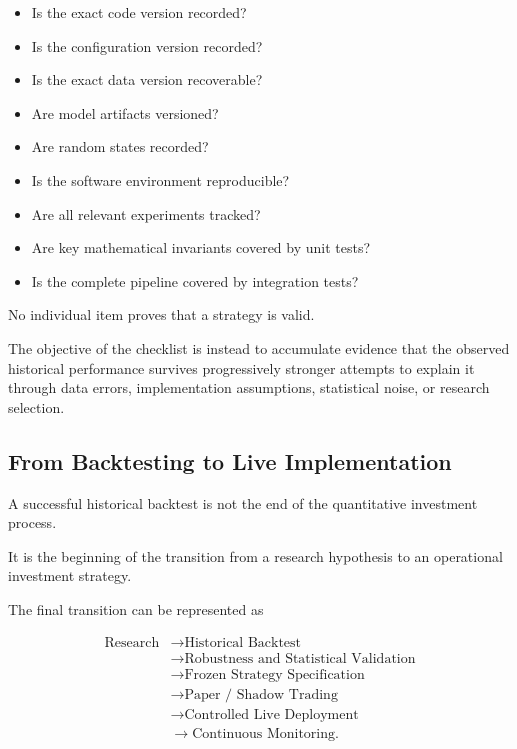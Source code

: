 \documentclass[11pt,a4paper]{article}
\begin{document}
\begin{itemize}
    \item[$\square$] Is the exact code version recorded?
    \item[$\square$] Is the configuration version recorded?
    \item[$\square$] Is the exact data version recoverable?
    \item[$\square$] Are model artifacts versioned?
    \item[$\square$] Are random states recorded?
    \item[$\square$] Is the software environment reproducible?
    \item[$\square$] Are all relevant experiments tracked?
    \item[$\square$] Are key mathematical invariants covered by unit tests?
    \item[$\square$] Is the complete pipeline covered by integration tests?
\end{itemize}

No individual item proves that a strategy is valid.

The objective of the checklist is instead to accumulate evidence that the
observed historical performance survives progressively stronger attempts to
explain it through data errors, implementation assumptions, statistical noise,
or research selection.


\subsection{From Backtesting to Live Implementation}
\label{subsec:backtesting_to_live}

A successful historical backtest is not the end of the quantitative investment
process.

It is the beginning of the transition from a research hypothesis to an
operational investment strategy.

The final transition can be represented as

\begin{equation}
\boxed{
\begin{aligned}
\text{Research}
&\rightarrow
\text{Historical Backtest}
\\
&\rightarrow
\text{Robustness and Statistical Validation}
\\
&\rightarrow
\text{Frozen Strategy Specification}
\\
&\rightarrow
\text{Paper / Shadow Trading}
\\
&\rightarrow
\text{Controlled Live Deployment}
\\
&\rightarrow
\text{Continuous Monitoring}.
\end{aligned}
}
\end{equation}
\end{document}
